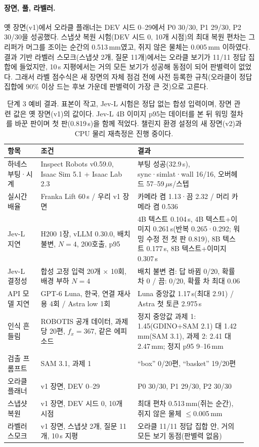 \paragraph{장면, 풀, 라벨러.}
옛 장면(v1)에서 오라클 플래너는 DEV 시드 0--29에서 P0 30/30, P1 29/30, P2 30/30을 성공했다. 스냅샷 복원 시험(DEV 시드 0, 10개 시점)의 최대 복원 편차는 그리퍼가 머그를 조이는 순간의 0.513\,mm였고, 쥐지 않은 물체는 0.005\,mm 이하였다. 결과 기반 라벨러 스모크(스냅샷 2개, 질문 11개)에서는 오라클 보기가 11/11 정답 집합에 들었지만, 10\,s 지평에서는 거의 모든 보기가 성공해 동점이 되어 판별력이 없었다. 그래서 라벨 점수식은 새 장면의 자체 점검 전에 사전 등록한 규칙(오라클이 정답 집합에 90\% 이상 드는 후보 가운데 판별력이 가장 큰 것)으로 고른다.

\begin{table}[t]
\centering
\scriptsize
\setlength{\tabcolsep}{4pt}
\begin{tabular}{@{}p{0.13\linewidth}p{0.38\linewidth}p{0.43\linewidth}@{}}
\toprule
항목 & 조건 & 결과 \\
\midrule
하네스 부팅·시계 & Inspect Robots v0.59.0, Isaac Sim 5.1 + Isaac Lab 2.3 & 부팅 성공(32.9\,s), sync·simlat·wall 16/16, 오버헤드 57--59\,$\mu$s/스텝 \\
실시간 배율 & Franka Lift 60\,s / 우리 v1 장면 & 카메라 켬 1.13·끔 2.32 / 머리 카메라 켬 0.536 \\
Jev-L 지연 & H200 1장, vLLM 0.30.0, 배치 불변, $N=4$, 200호출, p95 & 4B 텍스트 0.104\,s, 4B 텍스트+이미지 0.261\,s(반복 0.265·0.292; 워밍 수정 전 첫 판 0.819), 8B 텍스트 0.177\,s, 8B 텍스트+이미지 0.307\,s \\
Jev-L 결정성 & 합성 고정 입력 20개 $\times$ 10회, 배경 부하 $N=4$ & 배치 불변 켬: 답 바뀜 0/20, 확률 차 0 / 끔: 0/20, 확률 차 최대 0.06 \\
API 모델 지연 & GPT-6 Luna, 한국, 연결 재사용 4회 / Astra low 1회 & Luna 중앙값 1.17\,s(최대 2.91) / Astra 첫 토큰 2.975\,s \\
인식 흔들림 & ROBOTIS 공개 데이터, 과제당 20편, $f_x=367$, 같은 에피소드 & 정지 중앙값 과제 1: 1.45(GDINO+SAM 2.1) 대 1.42\,mm(SAM 3.1), 과제 2: 2.41 대 2.47\,mm; 정지 p95 9--16\,mm \\
검출 프롬프트 & SAM 3.1, 과제 1 & ``box'' 0/20편, ``basket'' 19/20편 \\
오라클 플래너 & v1 장면, DEV 0--29 & P0 30/30, P1 29/30, P2 30/30 \\
스냅샷 복원 & v1 장면, DEV 시드 0, 10개 시점 & 최대 편차 0.513\,mm(쥐는 순간), 쥐지 않은 물체 $\le$0.005\,mm \\
라벨러 스모크 & v1 장면, 스냅샷 2개, 질문 11개, 10\,s 지평 & 오라클 11/11 정답 집합 안, 거의 모든 보기 동점(판별력 없음) \\
\bottomrule
\end{tabular}
\caption{단계 3 예비 결과. 표본이 작고, Jev-L 시험은 정답 없는 합성 입력이며, 장면 관련 값은 옛 장면(v1)의 값이다. Jev-L 4B 이미지 p95는 데이터를 본 뒤 워밍 절차를 바꾼 판이며 첫 판(0.819\,s)을 함께 적었다. 챌린지 환경 설정의 새 장면(v2)과 CPU 물리 재측정은 진행 중이다.}
\label{tab:prelim3}
\end{table}

